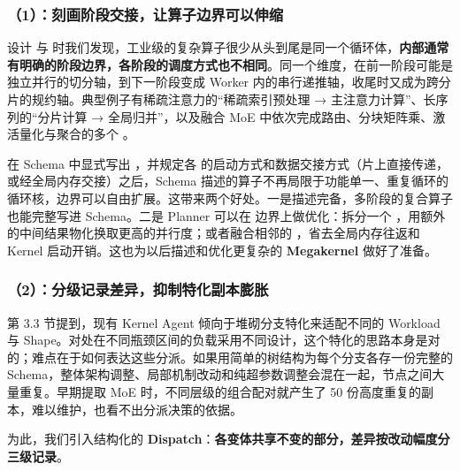 \begin{DiagramBlock}
\end{DiagramBlock}
\subsubsection{（1）：刻画阶段交接，让算子边界可以伸缩}
设计  与  时我们发现，工业级的复杂算子很少从头到尾是同一个循环体，\textbf{内部通常有明确的阶段边界，各阶段的调度方式也不相同}。同一个维度，在前一阶段可能是独立并行的切分轴，到下一阶段变成 Worker 内的串行递推轴，收尾时又成为跨分片的规约轴。典型例子有稀疏注意力的“稀疏索引预处理 → 主注意力计算”、长序列的“分片计算 → 全局归并”，以及融合 MoE 中依次完成路由、分块矩阵乘、激活量化与聚合的多个 。


在 Schema 中显式写出 ，并规定各  的启动方式和数据交接方式（片上直接传递，或经全局内存交接）之后，Schema 描述的算子不再局限于功能单一、重复循环的循环核，边界可以自由扩展。这带来两个好处。一是描述完备，多阶段的复合算子也能完整写进 Schema。二是 Planner 可以在  边界上做优化：拆分一个 ，用额外的中间结果物化换取更高的并行度；或者融合相邻的 ，省去全局内存往返和 Kernel 启动开销。这也为以后描述和优化更复杂的 \textbf{Megakernel} 做好了准备。


\subsubsection{（2）：分级记录差异，抑制特化副本膨胀}
第 3.3 节提到，现有 Kernel Agent 倾向于堆砌分支特化来适配不同的 Workload 与 Shape。对处在不同瓶颈区间的负载采用不同设计，这个特化的思路本身是对的；难点在于如何表达这些分派。如果用简单的树结构为每个分支各存一份完整的 Schema，整体架构调整、局部机制改动和纯超参数调整会混在一起，节点之间大量重复。早期提取 MoE 时，不同层级的组合配对就产生了 50 份高度重复的副本，难以维护，也看不出分派决策的依据。


为此，我们引入结构化的 \textbf{Dispatch}：\textbf{各变体共享不变的部分，差异按改动幅度分三级记录}。



